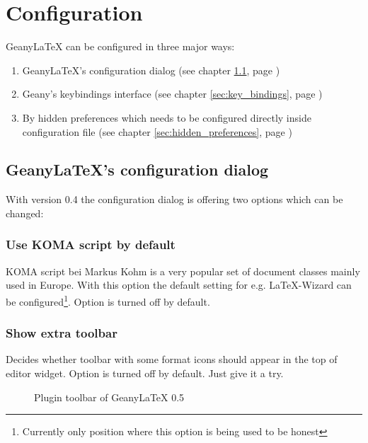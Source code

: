 \documentclass[%
paper=a4,%
fontsize=11pt,%
twoside=false,%
DIV18,%
headsepline,%
plainheadsepline,%
footsepline,%
plainfootsepline,%
bibliography=totoc,%
listof=totoc,%
BCOR10mm,%
parskip=half,%
openany,%
]{scrartcl}
\begin{document}
\section{Configuration}

GeanyLaTeX{} can be configured in three major ways:
\begin{enumerate}
\item GeanyLaTeX{}'s configuration dialog (see chapter \ref{sec:configuration_dialog},
	page \pageref{sec:configuration_dialog})
\item Geany's keybindings interface (see chapter \ref{sec:key_bindings},
	page \pageref{sec:key_bindings})
\item By hidden preferences which needs to be configured directly inside
	  configuration file (see chapter \ref{sec:hidden_preferences},
	page \pageref{sec:hidden_preferences})
\end{enumerate}

\subsection{GeanyLaTeX{}'s configuration dialog}
\label{sec:configuration_dialog}
With version 0.4 the configuration dialog is offering two options which
can be changed:

\subsubsection{Use KOMA script by default}
KOMA script bei Markus Kohm is a very popular set of document classes
mainly used in Europe. With this option the default setting for e.g.
\LaTeX{}-Wizard can be configured\footnote{Currently only position where
this option is being used to be honest}. Option is turned off by default.

\subsubsection{Show extra toolbar}
Decides whether toolbar with some format icons should appear in the top
of editor widget. Option is turned off by default. Just give it a try.

\begin{figure}[h!]
	\caption{Plugin toolbar of Geany\LaTeX{} 0.5}
\end{figure}
\end{document}
